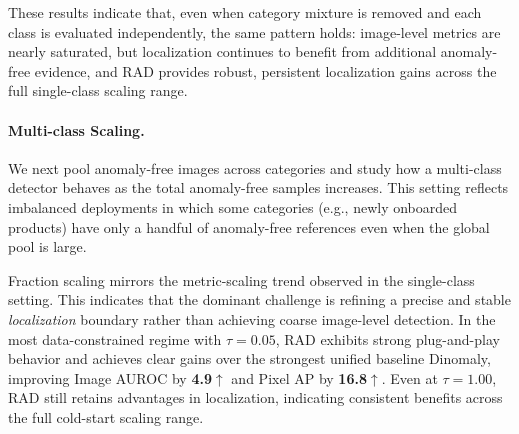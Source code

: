 \documentclass{article}
\theoremstyle{plain}
\theoremstyle{definition}
\theoremstyle{remark}
\begin{document}
These results indicate that, even when category mixture is removed and each class is evaluated independently, the same pattern holds: image-level metrics are nearly saturated, but localization continues to benefit from additional anomaly-free evidence, and RAD provides robust, persistent localization gains across the full single-class scaling range.






\paragraph{Multi-class Scaling.}
We next pool anomaly-free images across categories and study how a multi-class detector behaves as the total anomaly-free samples increases. This setting reflects imbalanced deployments in which some categories (e.g., newly onboarded products) have only a handful of anomaly-free references even when the global pool is large.


Fraction scaling mirrors the metric-scaling trend observed in the single-class setting. This indicates that the dominant challenge is refining a precise and stable \emph{localization} boundary rather than achieving coarse image-level detection. In the most data-constrained regime with $\tau{=}0.05$, RAD exhibits strong plug-and-play behavior and achieves clear gains over the strongest unified baseline Dinomaly, improving Image AUROC by \textbf{4.9$\uparrow$} and Pixel AP by \textbf{16.8$\uparrow$}. Even at $\tau{=}1.00$, RAD still retains advantages in localization, indicating consistent benefits across the full cold-start scaling range.


\end{document}
